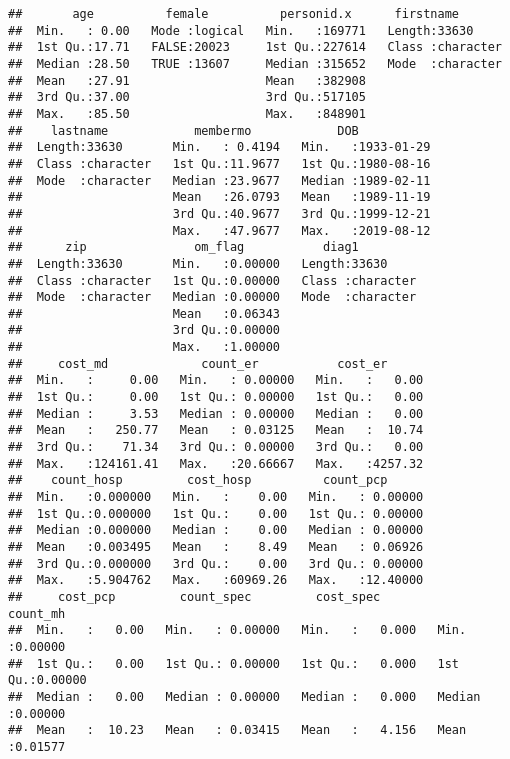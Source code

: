 \documentclass[]{article}
\begin{document}
\begin{verbatim}
##       age          female          personid.x      firstname        
##  Min.   : 0.00   Mode :logical   Min.   :169771   Length:33630      
##  1st Qu.:17.71   FALSE:20023     1st Qu.:227614   Class :character  
##  Median :28.50   TRUE :13607     Median :315652   Mode  :character  
##  Mean   :27.91                   Mean   :382908                     
##  3rd Qu.:37.00                   3rd Qu.:517105                     
##  Max.   :85.50                   Max.   :848901                     
##    lastname            membermo            DOB            
##  Length:33630       Min.   : 0.4194   Min.   :1933-01-29  
##  Class :character   1st Qu.:11.9677   1st Qu.:1980-08-16  
##  Mode  :character   Median :23.9677   Median :1989-02-11  
##                     Mean   :26.0793   Mean   :1989-11-19  
##                     3rd Qu.:40.9677   3rd Qu.:1999-12-21  
##                     Max.   :47.9677   Max.   :2019-08-12  
##      zip               om_flag           diag1          
##  Length:33630       Min.   :0.00000   Length:33630      
##  Class :character   1st Qu.:0.00000   Class :character  
##  Mode  :character   Median :0.00000   Mode  :character  
##                     Mean   :0.06343                     
##                     3rd Qu.:0.00000                     
##                     Max.   :1.00000                     
##     cost_md             count_er           cost_er       
##  Min.   :     0.00   Min.   : 0.00000   Min.   :   0.00  
##  1st Qu.:     0.00   1st Qu.: 0.00000   1st Qu.:   0.00  
##  Median :     3.53   Median : 0.00000   Median :   0.00  
##  Mean   :   250.77   Mean   : 0.03125   Mean   :  10.74  
##  3rd Qu.:    71.34   3rd Qu.: 0.00000   3rd Qu.:   0.00  
##  Max.   :124161.41   Max.   :20.66667   Max.   :4257.32  
##    count_hosp         cost_hosp          count_pcp       
##  Min.   :0.000000   Min.   :    0.00   Min.   : 0.00000  
##  1st Qu.:0.000000   1st Qu.:    0.00   1st Qu.: 0.00000  
##  Median :0.000000   Median :    0.00   Median : 0.00000  
##  Mean   :0.003495   Mean   :    8.49   Mean   : 0.06926  
##  3rd Qu.:0.000000   3rd Qu.:    0.00   3rd Qu.: 0.00000  
##  Max.   :5.904762   Max.   :60969.26   Max.   :12.40000  
##     cost_pcp         count_spec         cost_spec           count_mh      
##  Min.   :   0.00   Min.   : 0.00000   Min.   :   0.000   Min.   :0.00000  
##  1st Qu.:   0.00   1st Qu.: 0.00000   1st Qu.:   0.000   1st Qu.:0.00000  
##  Median :   0.00   Median : 0.00000   Median :   0.000   Median :0.00000  
##  Mean   :  10.23   Mean   : 0.03415   Mean   :   4.156   Mean   :0.01577  

\end{verbatim}
\end{document}
